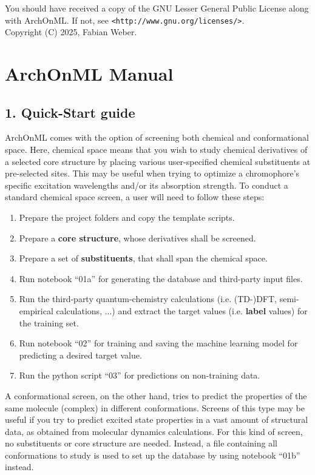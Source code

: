\documentclass[12pt]{achemso}
\begin{document}
\noindent You should have received a copy of the GNU Lesser General Public License along with ArchOnML. If not, see \verb+<http://www.gnu.org/licenses/>+.\\
Copyright (C) 2025, Fabian Weber.

\newpage
\section{ArchOnML Manual}

\subsection{1. Quick-Start guide}

\noindent ArchOnML comes with the option of screening both chemical and conformational space. Here, chemical space means that you wish to study chemical derivatives of a selected core structure by placing various user-specified chemical substituents at pre-selected sites. This may be useful when trying to optimize a chromophore's specific excitation wavelengths and/or its absorption strength. To conduct a standard chemical space screen, a user will need to follow these steps:

\begin{enumerate}
    \item Prepare the project folders and copy the template scripts.
    \item Prepare a \textbf{core structure}, whose derivatives shall be screened.
    \item Prepare a set of \textbf{substituents}, that shall span the chemical space.
    \item Run notebook ``01a'' for generating the database and third-party input files.
    \item Run the third-party quantum-chemistry calculations (i.e. (TD-)DFT, semi-empirical calculations, ...) and extract the target values (i.e. \textbf{label} values) for the training set.
    \item Run notebook ``02'' for training and saving the machine learning model for predicting a desired target value.
    \item Run the python script ``03'' for predictions on non-training data.
\end{enumerate}

\noindent A conformational screen, on the other hand, tries to predict the properties of the same molecule (complex) in different conformations. Screens of this type may be useful if you try to predict excited state properties in a vast amount of structural data, as obtained from molecular dynamics calculations. For this kind of screen, no substituents or core structure are needed. Instead, a file containing all conformations to study is used to set up the database by using notebook ``01b'' instead. 
\end{document}
